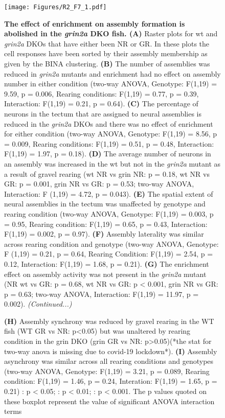 \clearpage
\begin{figure}[!ht]
        \captionsetup{}
        \centering
        \texttt{[image: Figures/R2\_F7\_1.pdf]}
       \caption[\label{fig:R2_F7} \textbf{The effect of enrichment on assembly formation is abolished in the \textit{grin2a} DKO fish.}]{\label{fig:R2_F7} \textbf{The effect of enrichment on assembly formation is abolished in the \textit{grin2a} DKO fish. (A)} Raster plots for \gls{wt} and \textit{grin2a} DKOs that have either been NR or GR. In these plots the cell responses have been sorted by their assembly membership as given by the BINA clustering. \textbf{(B)} The number of assemblies was reduced in \textit{grin2a} mutants and enrichment had no effect on assembly number in either condition (two-way ANOVA, Genotype: F(1,19) = 9.59, p = 0.006, Rearing conditions: F(1,19) =  0.77, p = 0.39, Interaction: F(1,19) = 0.21, p = 0.64). \textbf{(C)} The percentage of neurons in the tectum that are assigned to neural assemblies is reduced in the \textit{grin2a} DKOs and there was no effect of enrichment for either condition (two-way ANOVA, Genotype: F(1,19) = 8.56, p = 0.009, Rearing conditions: F(1,19) =  0.51, p = 0.48, Interaction:  F(1,19) = 1.97, p = 0.18). \textbf{(D)} The average number of neurons in an assembly was increased in the \gls{wt} but not in the \textit{grin2a} mutant as a result of gravel rearing (\gls{wt} NR vs \gls{grin} NR: p = 0.18, \gls{wt} NR vs GR: p = 0.001, \gls{grin} NR vs GR: p = 0.53; two-way ANOVA, Interaction: F (1,19) = 4.72, p = 0.043). \textbf{(E)} The spatial extent of neural assemblies in the tectum was unaffected by genotype and rearing condition (two-way ANOVA, Genotype: F(1,19) = 0.003, p = 0.95, Rearing condition: F(1,19) = 0.65, p = 0.43, Interaction: F(1,19) = 0.002, p = 0.97). \textbf{(F)} Assembly laterality was similar across rearing condition and genotype (two-way ANOVA, Genotype: F (1,19) = 0.21, p = 0.64, Rearing Condition:  F(1,19) = 2.54, p = 0.12, Interaction: F(1,19) = 1.68, p = 0.21). \textbf{(G)}  The enrichment effect on assembly activity was not present in the \textit{grin2a} mutant (NR \gls{wt} vs GR: p = 0.68, \gls{wt} NR vs GR: p < 0.001, \gls{grin} NR vs GR: p = 0.63; two-way ANOVA, Interaction: F(1,19) = 11.97, p =  0.002). \textit{(Continued...)}} 
    \end{figure}
    \clearpage
    \begin{figure}[!ht]
    \captionsetup{labelformat=adja-page}
    \ContinuedFloat
    \caption[]{ \textbf{(H)} Assembly synchrony was reduced by gravel rearing in the WT fish (WT GR vs NR: p<0.05) but was unaltered by rearing condition in the \gls{grin} DKO (\gls{grin} GR vs NR: p>0.05)(*the stat for two-way anova is missing due to covid-19 lockdown*). \textbf{(I)} Assembly asynchrony was similar across all rearing conditions and genotypes (two-way ANOVA, Genotype: F(1,19) = 3.21, p = 0.089, Rearing condition: F(1,19) = 1.46, p = 0.24, Interation: F(1,19) = 1.65, p = 0.21)  \text{*} : p < 0.05; \text{**} : p < 0.01; \text{***}: p < 0.001. The p values quoted on these boxplot represent the value of significant ANOVA interaction terms}
    \label{label{fig:R2_F7}}
\end{figure}



